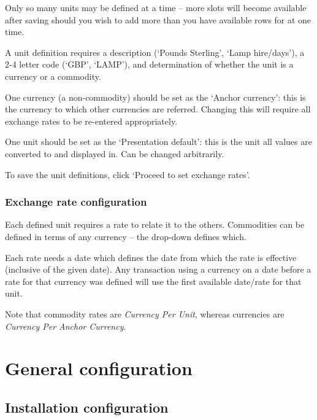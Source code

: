 \documentclass{report}
\begin{document}
Only so many units may be defined at a time -- more slots will become available after saving should you wish to add more than you have available rows for at one time.

A unit definition requires a description (`Pounds Sterling', `Lamp hire/days'), a 2-4 letter code (`GBP', `LAMP'), and determination of whether the unit is a currency or a commodity.

One currency (a non-commodity) should be set as the `Anchor currency': this is the currency to which other currencies are referred.  Changing this will require all exchange rates to be re-entered appropriately.

One unit should be set as the `Presentation default': this is the unit all values are converted to and displayed in.  Can be changed arbitrarily.

To save the unit definitions, click `Proceed to set exchange rates'.

\subsubsection{Exchange rate configuration}
Each defined unit requires a rate to relate it to the others.  Commodities can be defined in terms of any currency -- the drop-down defines which.

Each rate needs a date which defines the date from which the rate is effective (inclusive of the given date).  Any transaction using a currency on a date before a rate for that currency was defined will use the first available date/rate for that unit.

Note that commodity rates are \emph{Currency Per Unit}, whereas currencies are \emph{Currency Per Anchor Currency}.

\section{General configuration}
\subsection{Installation configuration}\label{inst_cfg}
\end{document}
